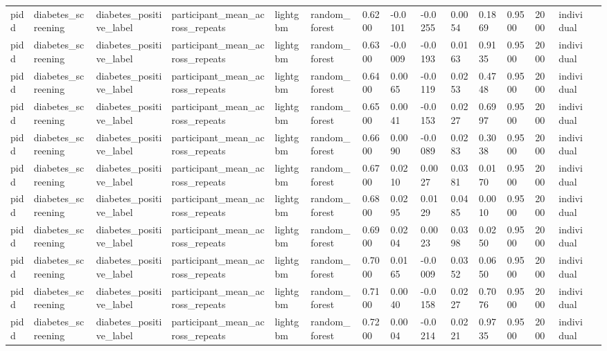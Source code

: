 \begin{tabular}{lllllllllllllll}
pidd & diabetes\_screening & diabetes\_positive\_label & participant\_mean\_across\_repeats & lightgbm & random\_forest & 0.6200 & -0.0101 & -0.0255 & 0.0054 & 0.1869 & 0.9500 & 2000 & individual &  \\
pidd & diabetes\_screening & diabetes\_positive\_label & participant\_mean\_across\_repeats & lightgbm & random\_forest & 0.6300 & -0.0009 & -0.0193 & 0.0163 & 0.9135 & 0.9500 & 2000 & individual &  \\
pidd & diabetes\_screening & diabetes\_positive\_label & participant\_mean\_across\_repeats & lightgbm & random\_forest & 0.6400 & 0.0065 & -0.0119 & 0.0253 & 0.4748 & 0.9500 & 2000 & individual &  \\
pidd & diabetes\_screening & diabetes\_positive\_label & participant\_mean\_across\_repeats & lightgbm & random\_forest & 0.6500 & 0.0041 & -0.0153 & 0.0227 & 0.6997 & 0.9500 & 2000 & individual &  \\
pidd & diabetes\_screening & diabetes\_positive\_label & participant\_mean\_across\_repeats & lightgbm & random\_forest & 0.6600 & 0.0090 & -0.0089 & 0.0283 & 0.3038 & 0.9500 & 2000 & individual &  \\
pidd & diabetes\_screening & diabetes\_positive\_label & participant\_mean\_across\_repeats & lightgbm & random\_forest & 0.6700 & 0.0210 & 0.0027 & 0.0381 & 0.0170 & 0.9500 & 2000 & individual &  \\
pidd & diabetes\_screening & diabetes\_positive\_label & participant\_mean\_across\_repeats & lightgbm & random\_forest & 0.6800 & 0.0295 & 0.0129 & 0.0485 & 0.0010 & 0.9500 & 2000 & individual &  \\
pidd & diabetes\_screening & diabetes\_positive\_label & participant\_mean\_across\_repeats & lightgbm & random\_forest & 0.6900 & 0.0204 & 0.0023 & 0.0398 & 0.0250 & 0.9500 & 2000 & individual &  \\
pidd & diabetes\_screening & diabetes\_positive\_label & participant\_mean\_across\_repeats & lightgbm & random\_forest & 0.7000 & 0.0165 & -0.0009 & 0.0352 & 0.0650 & 0.9500 & 2000 & individual &  \\
pidd & diabetes\_screening & diabetes\_positive\_label & participant\_mean\_across\_repeats & lightgbm & random\_forest & 0.7100 & 0.0040 & -0.0158 & 0.0227 & 0.7076 & 0.9500 & 2000 & individual &  \\
pidd & diabetes\_screening & diabetes\_positive\_label & participant\_mean\_across\_repeats & lightgbm & random\_forest & 0.7200 & 0.0004 & -0.0214 & 0.0221 & 0.9735 & 0.9500 & 2000 & individual &  \\

\end{tabular}
